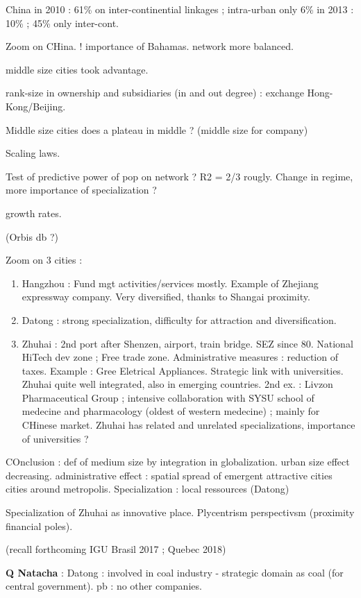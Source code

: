 China in 2010 : 61\% on inter-continential linkages ; intra-urban only 6\%
in 2013 : 10\% ; 45\% only inter-cont. 

Zoom on CHina. ! importance of Bahamas.
network more balanced.

middle size cities took advantage.

rank-size in ownership and subsidiaries (in and out degree) : exchange Hong-Kong/Beijing.

Middle size cities does a plateau in middle ? (middle size for company)

Scaling laws.

Test of predictive power of pop on network ? R2 =  2/3 rougly.
Change in regime, more importance of specialization ?

growth rates.

(Orbis db ?)

Zoom on 3 cities :
\begin{enumerate}
\item Hangzhou : Fund mgt activities/services mostly. Example of Zhejiang expressway company. Very diversified, thanks to Shangai proximity.
\item Datong : strong specialization, difficulty for attraction and diversification.
\item Zhuhai : 2nd port after Shenzen, airport, train bridge. SEZ since 80. National HiTech dev zone ; Free trade zone. Administrative measures : reduction of taxes. Example : Gree Eletrical Appliances. Strategic link with universities. Zhuhai quite well integrated, also in emerging countries. 2nd ex. : Livzon Pharmaceutical Group ; intensive collaboration with SYSU school of medecine and pharmacology (oldest of western medecine) ; mainly for CHinese market. Zhuhai has related and unrelated specializations, importance of universities ?
\end{enumerate}

COnclusion :
def of medium size by integration in globalization.
urban size effect decreasing.
administrative effect : spatial spread of emergent attractive cities
cities around metropolis.
Specialization : local ressources (Datong)

Specialization of Zhuhai as innovative place.
Plycentrism perspectivsm (proximity financial poles).

(recall forthcoming IGU Brasil 2017 ; Quebec 2018)



\textbf{Q Natacha} : Datong : involved in coal industry - strategic domain as coal (for central government). pb : no other companies.

